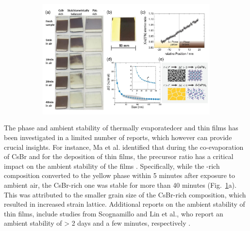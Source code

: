 \begin{figure}[htbp]
    \centering
    \begin{subfigure}[t]{0.99\textwidth}
        \centering
        \includegraphics[width=\textwidth]{chapters/stability/imeges/Stability_Lierature.pdf} %
    \end{subfigure}

    \caption{}
    \label{fig:stability:literature_review}
\end{figure}


The phase and ambient stability of thermally evaporatedcer  and  thin films has been investigated in a limited number of reports, which however can provide crucial insights. For instance, Ma et al. identified that during the co-evaporation of CsBr and  for the deposition of  thin films, the precursor ratio has a critical impact on the ambient stability of the films \cite{Ma2017TheCells}. Specifically, while the -rich composition converted to the yellow phase within 5 minutes after exposure to ambient air, the CsBr-rich one was stable for more than 40 minutes (Fig.~\ref{fig:stability:literature_review}a). This was attributed to the smaller grain size of the CsBr-rich composition, which resulted in increased strain lattice. Additional reports on the ambient stability of  thin films, include studies from Scognamillo and Lin et al., who report an ambient stability of > 2 days and a few minutes, respectively \cite{Scognamillo2019FullyCsPbI2Br, Lin2019EfficientDeposition}.

